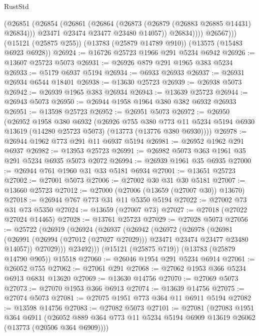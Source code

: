\begin{lexlean}{RustStd}
\begin{coremodule}
                (@26851
                  (@26854
                    (@26861
                      (@26864 (@26873 (@26879 (@26883 @26885 @14431) @26834)))
                      @23471
                      @23474
                      @23477
                      @23480
                      @14057))
                  @26834))))
          @26567)))
    (@15121 (@25875 @255))
    (@13783 (@25879 @14789 @910))
    (@13575 (@15483 @6923 @6928))
@26924 := @16726 @25723 @1966 @291 @5234 @6942
@26926 := @13607 @25723 @5073
@26931 := @26926 @879 @291 @1965 @383 @5234
@26933 := @5179 @6937 @5194
@26934 := @6933 @26933
@26937 := @26931 @26934 @6544 @18401
@26938 := @13630 @25723
@26939 := @26938 @5073
@26942 := @26939 @1965 @383 @26934
@26943 := @13639 @25723
@26944 := @26943 @5073
@26950 := @26944 @1958 @1964 @380 @382 @6932 @26933
@26951 := @13598 @25723
@26952 := @26951 @5073
@26972 := @26950
    (@26952
      @1958
      @380
      @6932
      (@26926
        @755
        @380
        @773
        @11
        @5234
        @5194
        @6930
        @13619
        (@14280 @25723 @5073)
        (@13773 (@13776 @380 @6930))))
@26978 := @26944 @1962 @773 @291 @11 @6937 @5194
@26981 := @26952 @1962 @291 @6937
@26982 := @13953 @25723
@26991 := @26982 @5073 @363 @1961 @35 @291 @5234 @6935 @5073 @2072
@26994 := @26939 @1961 @35 @6935
@27000 := @26944 @761 @1960 @31 @33 @5181 @6934
@27001 := @13651 @25723
@27002 := @27001 @5073
@27006 := @27002 @30 @31 @30 @5181
@27007 := @13660 @25723
@27012 := @27000 (@27006 (@13659 (@27007 @30)) @13670)
@27018 := @26944 @767 @773 @31 @11 @5350 @5194
@27022 := @27002 @73 @31 @73 @5350
@27024 := @13659 (@27007 @73)
@27027 := @27018 (@27022 @27024 @14465)
@27028 := @13761 @25723
@27029 := @27028 @5073
@27056 := @25722
    (@26919
      (@26924
        (@26937
          (@26942
            (@26972
              (@26978
                (@26981
                  (@26991 (@26994 (@27012 (@27027 @27029))) @23471 @23474 @23477 @23480 @14057))
                @27029)))
          @23492)))
    (@15121 (@25875 @719))
    (@13783 (@25879 @14790 @905))
    @15518
@27060 := @26046 @1954 @291 @5234 @6914
@27061 := @26052 @755
@27062 := @27061 @291
@27068 := @27062 @1953 @366 @5234 @6913 @6831 @13620
@27069 := @13630 @14756
@27070 := @27069 @5073
@27073 := @27070 @1953 @366 @6913
@27074 := @13639 @14756
@27075 := @27074 @5073
@27081 := @27075 @1951 @773 @364 @11 @6911 @5194
@27082 := @13598 @14756
@27083 := @27082 @5073
@27101 := @27081
    (@27083
      @1951
      @364
      @6911
      (@26052 @889 @364 @773 @11 @5234 @5194 @6909 @13619 @26062 (@13773 (@20506 @364 @6909))))

\end{coremodule}
\end{lexlean}
